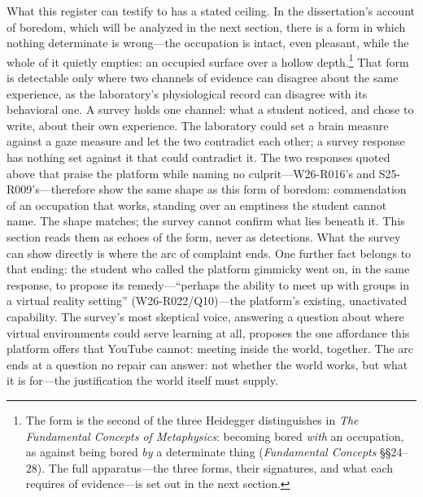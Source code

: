 What this register can testify to has a stated ceiling. In the
dissertation's account of boredom, which will be analyzed in the next
section, there is a form in which nothing determinate is
wrong---the occupation is intact, even pleasant, while the whole of it
quietly empties: an occupied surface over a hollow depth.\footnote{The
form is the second of the three Heidegger distinguishes in \textit{The
Fundamental Concepts of Metaphysics}: becoming bored \textit{with} an
occupation, as against being bored \textit{by} a determinate thing
(\textit{Fundamental Concepts} \S\S24--28). The full apparatus---the
three forms, their signatures, and what each requires of
evidence---is set out in the next section.} That form is detectable
only where two channels of evidence can disagree about the same
%
%
experience, as the laboratory's physiological record can disagree with
its behavioral one. A survey holds one channel: what a student
noticed, and chose to write, about their own experience. The
laboratory could set a brain measure against a gaze measure and let
the two contradict each other; a survey response has nothing set
against it that could contradict it. The two responses quoted above
that praise the platform while naming no culprit---W26-R016's and
S25-R009's---therefore show the same shape as this form of boredom:
commendation of an occupation that works, standing over an emptiness
the student cannot name. The shape matches; the survey cannot confirm
what lies beneath it. This section reads them as echoes of the form,
never as detections. What the survey can show directly is where the
arc of complaint ends. One further fact belongs to that ending: the
student who called the platform gimmicky went on, in the same
response, to propose its remedy---``perhaps the ability to meet up
with groups in a virtual reality setting'' (W26-R022/Q10)---the
platform's existing, unactivated capability. The survey's most
skeptical voice, answering a question about where virtual environments
could serve learning at all, proposes the one affordance this platform
offers that YouTube cannot: meeting inside the world, together. The
arc ends at a question no repair can answer: not whether the world
works, but what it is for---the justification the world itself must
supply.
